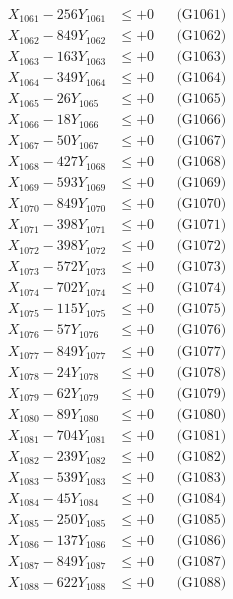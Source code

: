 \documentclass[a4paper,10pt]{article}
\begin{document}
{\begin{align}
\allowbreak
X_{1061} - 256Y_{1061} &\leq +0 && \text{(G1061)} \\
X_{1062} - 849Y_{1062} &\leq +0 && \text{(G1062)} \\
X_{1063} - 163Y_{1063} &\leq +0 && \text{(G1063)} \\
X_{1064} - 349Y_{1064} &\leq +0 && \text{(G1064)} \\
X_{1065} - 26Y_{1065} &\leq +0 && \text{(G1065)} \\
X_{1066} - 18Y_{1066} &\leq +0 && \text{(G1066)} \\
X_{1067} - 50Y_{1067} &\leq +0 && \text{(G1067)} \\
X_{1068} - 427Y_{1068} &\leq +0 && \text{(G1068)} \\
X_{1069} - 593Y_{1069} &\leq +0 && \text{(G1069)} \\
X_{1070} - 849Y_{1070} &\leq +0 && \text{(G1070)} \\
\allowbreak
X_{1071} - 398Y_{1071} &\leq +0 && \text{(G1071)} \\
X_{1072} - 398Y_{1072} &\leq +0 && \text{(G1072)} \\
X_{1073} - 572Y_{1073} &\leq +0 && \text{(G1073)} \\
X_{1074} - 702Y_{1074} &\leq +0 && \text{(G1074)} \\
X_{1075} - 115Y_{1075} &\leq +0 && \text{(G1075)} \\
X_{1076} - 57Y_{1076} &\leq +0 && \text{(G1076)} \\
X_{1077} - 849Y_{1077} &\leq +0 && \text{(G1077)} \\
X_{1078} - 24Y_{1078} &\leq +0 && \text{(G1078)} \\
X_{1079} - 62Y_{1079} &\leq +0 && \text{(G1079)} \\
X_{1080} - 89Y_{1080} &\leq +0 && \text{(G1080)} \\
\allowbreak
X_{1081} - 704Y_{1081} &\leq +0 && \text{(G1081)} \\
X_{1082} - 239Y_{1082} &\leq +0 && \text{(G1082)} \\
X_{1083} - 539Y_{1083} &\leq +0 && \text{(G1083)} \\
X_{1084} - 45Y_{1084} &\leq +0 && \text{(G1084)} \\
X_{1085} - 250Y_{1085} &\leq +0 && \text{(G1085)} \\
X_{1086} - 137Y_{1086} &\leq +0 && \text{(G1086)} \\
X_{1087} - 849Y_{1087} &\leq +0 && \text{(G1087)} \\
X_{1088} - 622Y_{1088} &\leq +0 && \text{(G1088)} \\

\end{align}}
\end{document}
